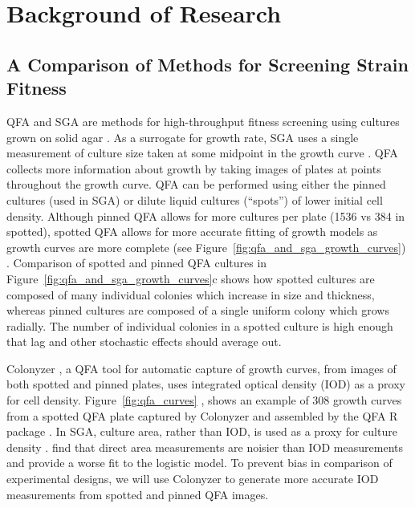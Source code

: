\graphicspath{{images_low_res/}}

\section{Background of Research}
\label{sec:background}

\subsection{A Comparison of Methods for Screening Strain Fitness }

QFA and SGA are methods for high-throughput fitness screening using cultures grown on
solid agar \citep{Baryshnikova2010sga,Banks2012}. As a surrogate for growth rate, SGA uses
a single measurement of culture size taken at some midpoint in the growth curve
\citep{Baryshnikova2010sga}. QFA collects more information about growth by taking images
of plates at points throughout the growth curve. QFA can be performed using either the
pinned cultures (used in SGA) or dilute liquid cultures (``spots'') of lower initial cell
density. Although pinned QFA allows for more cultures per plate (1536 vs 384 in spotted),
spotted QFA allows for more accurate fitting of growth models as growth curves are more
complete (see Figure~\ref{fig:qfa_and_sga_growth_curves}) \citep{Lawless2010}. Comparison
of spotted and pinned QFA cultures in Figure~\ref{fig:qfa_and_sga_growth_curves}c shows
how spotted cultures are composed of many individual colonies which increase in size and
thickness, whereas pinned cultures are composed of a single uniform colony which grows
radially. The number of individual colonies in a spotted culture is high enough that lag
and other stochastic effects should average out.

Colonyzer \citep{Lawless2010}, a QFA tool for automatic capture of growth curves, from
images of both spotted and pinned plates, uses integrated optical density (IOD) as a proxy
for cell density. Figure~\ref{fig:qfa_curves} \citep{Banks2012}, shows an example of 308
growth curves from a spotted QFA plate captured by Colonyzer and assembled by the QFA R
package \citep{qfa2016}. In SGA, culture area, rather than IOD, is used as a proxy for
culture density \citep{Baryshnikova2010sga}. \citet{Lawless2010} find that direct area
measurements are noisier than IOD measurements and provide a worse fit to the logistic
model. To prevent bias in comparison of experimental designs, we will use Colonyzer to
generate more accurate IOD measurements from spotted and pinned QFA images.


